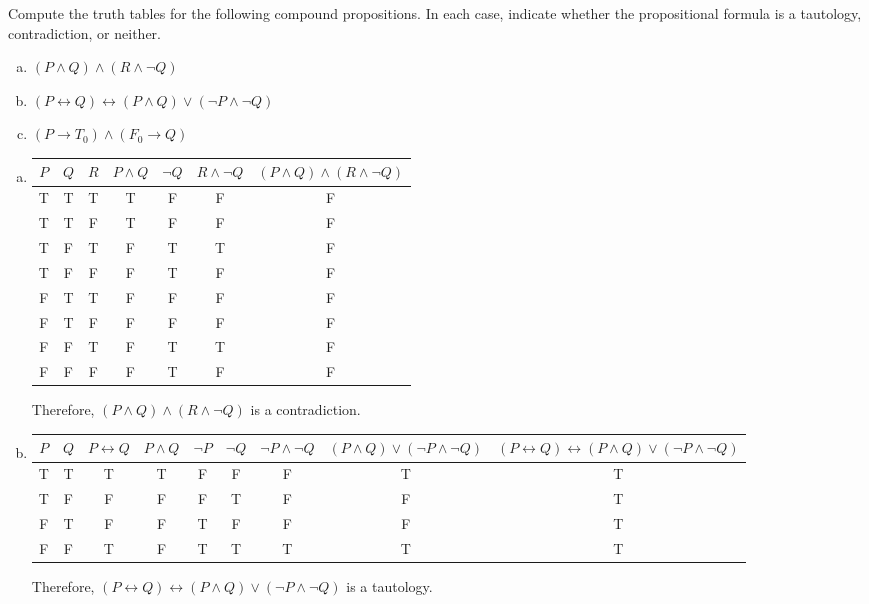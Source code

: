 \documentclass[11pt,letterpaper]{article}
\begin{document}
\newpage



 Compute the truth tables for the following compound propositions. In each case, indicate whether the propositional formula is a tautology, contradiction, or neither. 
	\begin{enumerate}[(a),topsep=0pt]
	\item $(P \wedge Q) \wedge (R \wedge \neg Q)$
	\item $(P \leftrightarrow Q) \leftrightarrow (P \wedge Q) \vee (\neg P \wedge \neg Q)$
	\item $(P \to T_0) \wedge (F_0 \to Q)$
	\end{enumerate}

\sol
\begin{enumerate}[(a)]
\item \phantom{.}
	\begin{table}[!ht]
	\centering
	\begin{tabular}{c|c|c||c|c|c||c}
	$P$ & $Q$ & $R$ & $P \wedge Q$ & $\neg Q$ & $R \wedge \neg Q$ & $(P \wedge Q) \wedge (R \wedge \neg Q)$ \\ \hline
	T & T & T & T & F & F & F \\
	T & T & F & T & F & F & F \\
	T & F & T & F & T & T & F \\
	T & F & F & F & T & F & F \\
	F & T & T & F & F & F & F \\
	F & T & F & F & F & F & F \\
	F & F & T & F & T & T & F \\
	F & F & F & F & T & F & F
	\end{tabular}
	\end{table} \par
Therefore, $(P \wedge Q) \wedge (R \wedge \neg Q)$ is a contradiction. 

\item \phantom{.}
	\begin{table}[!ht]
	\hspace{-1.1cm}
	\begin{tabular}{c|c||c|c|c|c|c|c||c}
	$P$ & $Q$ & $P \leftrightarrow Q$ & $P \wedge Q$ & $\neg P$ & $\neg Q$ & $\neg P \wedge \neg Q$ & $(P \wedge Q) \vee (\neg P \wedge \neg Q)$ & $(P \leftrightarrow Q) \leftrightarrow (P \wedge Q) \vee (\neg P \wedge \neg Q)$ \\ \hline
	T & T & T & T & F & F & F & T & T \\
	T & F & F & F & F & T & F & F & T \\
	F & T & F & F & T & F & F & F & T \\
	F & F & T & F & T & T & T & T & T 
	\end{tabular}
	\end{table} \par
Therefore, $(P \leftrightarrow Q) \leftrightarrow (P \wedge Q) \vee (\neg P \wedge \neg Q)$ is a tautology. 


\end{enumerate}
\end{document}
